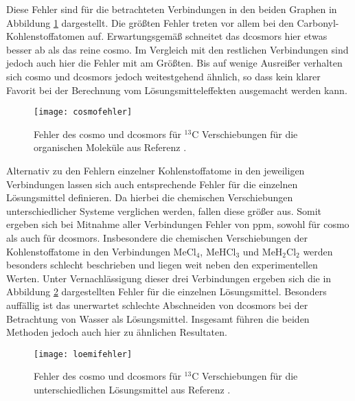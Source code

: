     Diese Fehler sind für die betrachteten Verbindungen in den beiden Graphen in Abbildung \ref{abb:cosmofehler} dargestellt. Die größten Fehler treten vor allem bei den Carbonyl-Kohlenstoffatomen auf. Erwartungsgemäß schneitet das \ac{dcosmors} hier etwas besser ab als das reine \ac{cosmo}. Im Vergleich mit den restlichen Verbindungen sind jedoch auch hier die Fehler mit am Größten. Bis auf wenige Ausreißer verhalten sich \ac{cosmo} und \ac{dcosmors} jedoch weitestgehend ähnlich, so dass kein klarer Favorit bei der Berechnung vom Lösungsmitteleffekten ausgemacht werden kann.
   	\begin{figure}[ht!]
	\centering
	\texttt{[image: cosmofehler]}
	\captionsetup{figurewithin = chapter}
	\captionsetup{font=small, labelfont=bf}\caption[{Fehler des \ac{cosmo} und \ac{dcosmors} für $^{13}$C Verschiebungen}]{Fehler des \ac{cosmo} und \ac{dcosmors} für $^{13}$C Verschiebungen für die organischen Moleküle aus Referenz \cite{fulmer2010nmr}.}
	\label{abb:cosmofehler}
	\end{figure} 
\vfill
\newpage
	Alternativ zu den Fehlern einzelner Kohlenstoffatome in den jeweiligen Verbindungen lassen sich auch entsprechende Fehler für die einzelnen Lösungsmittel definieren. Da hierbei die chemischen Verschiebungen unterschiedlicher Systeme verglichen werden, fallen diese größer aus. Somit ergeben sich bei Mitnahme aller Verbindungen Fehler von \unit[10-11]{ppm}, sowohl für \ac{cosmo} als auch für \ac{dcosmors}. Insbesondere die chemischen Verschiebungen der Kohlenstoffatome in den Verbindungen MeCl$_4$, MeHCl$_3$ und MeH$_2$Cl$_2$ werden besonders schlecht beschrieben und liegen weit neben den experimentellen Werten. Unter Vernachlässigung dieser drei Verbindungen ergeben sich die in Abbildung \ref{abb:loemifehler} dargestellten Fehler für die einzelnen Lösungsmittel. Besonders auffällig ist das unerwartet schlechte Abschneiden von \ac{dcosmors} bei der Betrachtung von Wasser als Lösungsmittel. Insgesamt führen die beiden Methoden jedoch auch hier zu ähnlichen Resultaten.
   	\begin{figure}[ht!]
	\centering
	\texttt{[image: loemifehler]}
	\captionsetup{figurewithin = chapter}
	\captionsetup{font=small, labelfont=bf}\caption[{Fehler des \ac{cosmo} und \ac{dcosmors} für unterschiedliche Lösungsmittel}]{Fehler des \ac{cosmo} und \ac{dcosmors} für $^{13}$C Verschiebungen für die unterschiedlichen Lösungsmittel aus Referenz \cite{fulmer2010nmr}.}
	\label{abb:loemifehler}
	\end{figure}    	
\vfil
\newpage
	
